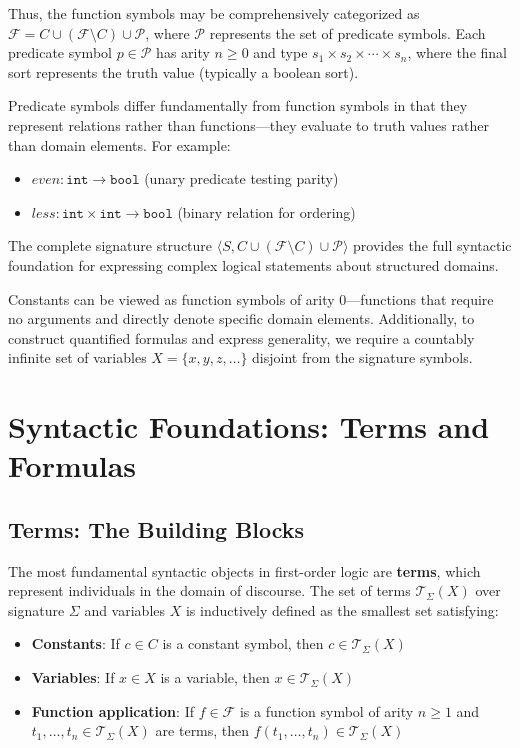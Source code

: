 \documentclass[11pt,a4paper]{article}
\theoremstyle{definition}
\theoremstyle{plain}
\theoremstyle{remark}
\begin{document}
Thus, the function symbols may be comprehensively categorized as $\mathcal{F} = C \cup (\mathcal{F} \setminus C) \cup \mathcal{P}$, where $\mathcal{P}$ represents the set of predicate symbols. Each predicate symbol $p \in \mathcal{P}$ has arity $n \geq 0$ and type $s_1 \times s_2 \times \cdots \times s_n$, where the final sort represents the truth value (typically a boolean sort).

Predicate symbols differ fundamentally from function symbols in that they represent relations rather than functions---they evaluate to truth values rather than domain elements. For example:
\begin{itemize}
    \item $even : \texttt{int} \rightarrow \texttt{bool}$ (unary predicate testing parity)
    \item $less : \texttt{int} \times \texttt{int} \rightarrow \texttt{bool}$ (binary relation for ordering)
\end{itemize}

The complete signature structure $\langle S, C \cup (\mathcal{F} \setminus C) \cup \mathcal{P} \rangle$ provides the full syntactic foundation for expressing complex logical statements about structured domains.

Constants can be viewed as function symbols of arity 0---functions that require no arguments and directly denote specific domain elements. Additionally, to construct quantified formulas and express generality, we require a countably infinite set of variables $X = \{x, y, z, \dots\}$ disjoint from the signature symbols.

\section{Syntactic Foundations: Terms and Formulas}

\subsection{Terms: The Building Blocks}

The most fundamental syntactic objects in first-order logic are \textbf{terms}, which represent individuals in the domain of discourse. The set of terms $\mathcal{T}_\Sigma(X)$ over signature $\Sigma$ and variables $X$ is inductively defined as the smallest set satisfying:

\begin{itemize}
    \item \textbf{Constants}: If $c \in C$ is a constant symbol, then $c \in \mathcal{T}_\Sigma(X)$
    \item \textbf{Variables}: If $x \in X$ is a variable, then $x \in \mathcal{T}_\Sigma(X)$
    \item \textbf{Function application}: If $f \in \mathcal{F}$ is a function symbol of arity $n \geq 1$ and $t_1, \dots, t_n \in \mathcal{T}_\Sigma(X)$ are terms, then $f(t_1, \dots, t_n) \in \mathcal{T}_\Sigma(X)$
\end{itemize}
\end{document}
